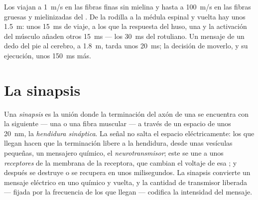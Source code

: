 \begin{example}[La velocidad]\label{ex:g12:stretch-reflex:speed}
Los  viajan a \qty{1}{m/s} en las fibras finas sin
mielina y hasta a \qty{100}{m/s} en las fibras gruesas y mielinizadas
del . De la rodilla a la médula espinal y vuelta hay
unos \qty{1.5}{m}: unos \qty{15}{ms} de viaje, a los que la respuesta
del huso, una  y la activación del músculo añaden otros
\qty{15}{ms} --- los \qty{30}{ms} del  rotuliano. Un mensaje de
un dedo del pie al cerebro, a \qty{1.8}{m}, tarda unos \qty{20}{ms}; la
decisión de moverlo, y su ejecución, unos \qty{150}{ms} más.
\end{example}

\section{La sinapsis}

\begin{definition}\label{def:g12:stretch-reflex:synapse}
Una \emph{sinapsis} es la unión donde la terminación
del axón de una  se encuentra con la  siguiente --- una
 o una fibra muscular --- a través de un espacio de unos
\qty{20}{nm}, la \emph{hendidura sináptica}. La señal no salta el
espacio eléctricamente: los  que llegan hacen que
la terminación libere a la hendidura, desde unas vesículas pequeñas, un
mensajero químico, el
\emph{neurotransmisor}; este se une a unos
\emph{receptores} de la membrana de la  receptora, que cambian el
voltaje de esa ; y después se destruye o se recupera en unos
milisegundos. La sinapsis convierte un mensaje eléctrico en uno químico
y vuelta, y la cantidad de transmisor liberada --- fijada por la
frecuencia de los  que llegan --- codifica la
intensidad del mensaje.
\end{definition}

